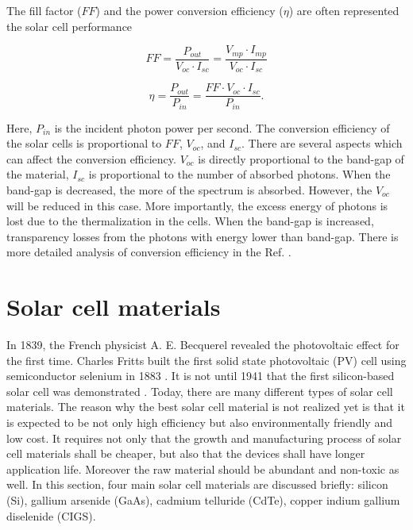 \documentclass[a4paper, 12pt, titlepage,oneside,drop]{kthesis}
\begin{document}
The fill factor ($FF$) and the power conversion efficiency ($\eta$) are often represented the solar cell performance

\begin{equation}
FF = \frac{P_{out}}{V_{oc} \cdot I_{sc}} = \frac{V_{mp} \cdot I_{mp}}{V_{oc} \cdot I_{sc}}
\end{equation}

\begin{equation}
\eta = \frac{P_{out}}{P_{in}} = \frac{FF \cdot V_{oc} \cdot I_{sc}}{P_{in}}.
\end{equation}

Here, $P_{in}$ is the incident photon power per second. The conversion efficiency of the solar cells is proportional to $FF$, $V_{oc}$, and $I_{sc}$. There are several aspects which can affect
the conversion efficiency. $V_{oc}$ is directly proportional to the band-gap of the material, $I_{sc}$ is proportional to the number of absorbed photons. When the band-gap is decreased, the more of the spectrum is absorbed. However, 
the $V_{oc}$ will be reduced in this case. More importantly, the excess energy of photons is lost due to the thermalization in the cells. When the band-gap is increased, transparency losses from the photons with energy lower than
band-gap. There is more detailed analysis of conversion efficiency in the Ref. \cite{bok1}.


\section{Solar cell materials}

In 1839,  the French physicist A. E. Becquerel \cite{Becquerel} revealed the photovoltaic effect for the first time. Charles Fritts built the first solid state photovoltaic (PV) cell using semiconductor selenium in 
1883 \cite{etgar2013semiconductor,gourdin2007solar}. It is not until 1941 that
the first silicon-based solar cell was demonstrated \cite{1941ohl1, 1941ohl2}. Today, there are many different types of solar cell materials. The reason why the best solar cell material is not realized yet is that it is expected to be not only high efficiency but 
also environmentally friendly and low cost. It requires not only that the growth and manufacturing process of solar cell materials shall be cheaper, but also that the devices shall have longer application life. Moreover the raw material
should be abundant and non-toxic as well. In this section, four main solar cell materials are discussed briefly: silicon (Si), gallium arsenide (GaAs), cadmium telluride (CdTe), copper indium gallium diselenide (CIGS).
\end{document}
